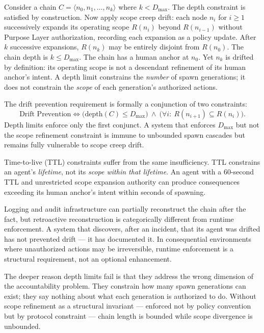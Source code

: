 Consider a chain $C = \langle n_0, n_1, \ldots, n_k \rangle$ where $k < D_{\max}$. The depth constraint is satisfied by construction. Now apply scope creep drift: each node $n_i$ for $i \geq 1$ successively expands its operating scope $R(n_i)$ beyond $R(n_{i-1})$ without Purpose Layer authorization, recording each expansion as a policy update. After $k$ successive expansions, $R(n_k)$ may be entirely disjoint from $R(n_0)$. The chain depth is $k \leq D_{\max}$. The chain has a human anchor at $n_0$. Yet $n_k$ is drifted by definition: its operating scope is not a descendant refinement of its human anchor's intent. A depth limit constrains the \emph{number} of spawn generations; it does not constrain the \emph{scope} of each generation's authorized actions.

The drift prevention requirement is formally a conjunction of two constraints:
\begin{equation}
\text{Drift Prevention} \iff \bigl(\text{depth}(C) \leq D_{\max}\bigr)\ \land\ \bigl(\forall i:\ R(n_{i+1}) \subseteq R(n_i)\bigr).
\label{eq:drift-prevention}
\end{equation}
Depth limits enforce only the first conjunct. A system that enforces $D_{\max}$ but not the scope refinement constraint is immune to unbounded spawn cascades but remains fully vulnerable to scope creep drift.

Time-to-live (TTL) constraints suffer from the same insufficiency. TTL constrains an agent's \emph{lifetime}, not its \emph{scope within that lifetime}. An agent with a 60-second TTL and unrestricted scope expansion authority can produce consequences exceeding its human anchor's intent within seconds of spawning.

Logging and audit infrastructure can partially reconstruct the chain after the fact, but retroactive reconstruction is categorically different from runtime enforcement. A system that discovers, after an incident, that its agent was drifted has not prevented drift — it has documented it. In consequential environments where unauthorized actions may be irreversible, runtime enforcement is a structural requirement, not an optional enhancement.

The deeper reason depth limits fail is that they address the wrong dimension of the accountability problem. They constrain how many spawn generations can exist; they say nothing about what each generation is authorized to do. Without scope refinement as a structural invariant — enforced not by policy convention but by protocol constraint — chain length is bounded while scope divergence is unbounded.

